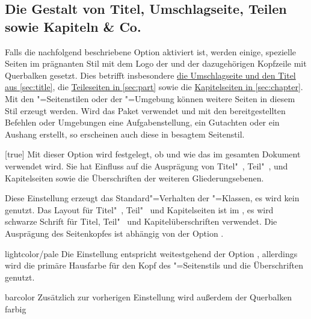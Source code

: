 \begin{Declaration*}{}
\begin{Declaration*}{}
\begin{Declaration*}{}
\subsection{Die Gestalt von Titel, Umschlagseite, Teilen sowie Kapiteln \& Co.}
%
%
%
%
Falls die nachfolgend beschriebene Option  aktiviert ist, 
werden einige, spezielle Seiten im prägnanten Stil mit dem Logo der \TnUD und 
der dazugehörigen Kopfzeile mit Querbalken gesetzt. Dies betrifft insbesondere 
\hyperref[sec:title]{die Umschlagseite und den Titel aus \autoref{sec:title}}, 
die \hyperref[sec:part]{Teileseiten in \autoref{sec:part}} sowie die
\hyperref[sec:chapter]{Kapitelseiten in \autoref{sec:chapter}}. Mit den 
"=Seitenstilen oder der "=Umgebung 
können weitere Seiten in diesem Stil erzeugt werden. Wird das Paket 
 verwendet und mit den bereitgestellten Befehlen oder 
Umgebungen eine Aufgabenstellung, ein Gutachten oder ein Aushang erstellt, so 
erscheinen auch diese in besagtem Seitenstil.
%
\begin{Declaration}[%
  v2.03!\Option{cd=bicolor}:%
    Farbeinsatz nur im Kopf mit farbig abgesetztem Querbalken;
  v2.03!\Option{cd=fullcolor}:%
    voller Farbeinsatz mit farbig abgesetztem Querbalken;%
  v2.04!\Option{cd=barcolor}:nur farbig abgesetzter Querbalken;%
]{}[true]
\printdeclarationlist%
%
Mit dieser Option wird festgelegt, ob und wie das \TUDCD im gesamten Dokument 
verwendet wird. Sie hat Einfluss auf die Ausprägung von Titel"~, Teil"~, und 
Kapitelseiten sowie die Überschriften der weiteren Gliederungsebenen.
%
\begin{values}{}
\itemfalse
  Diese Einstellung erzeugt das Standard"=Verhalten der \KOMAScript"=Klassen, 
  es wird kein \CD genutzt.
  Das Layout für Titel"~, Teil"~ und Kapitelseiten ist im \CD, es wird 
  schwarze Schrift für Titel, Teil"~ und Kapitelüberschriften verwendet. Die 
  Ausprägung des Seitenkopfes ist abhängig von der Option .
\item[lightcolor/pale]
  Die Einstellung entspricht weitestgehend der Option , 
  allerdings wird die primäre Hausfarbe  für den Kopf des 
  "=Seitenstils und die Überschriften genutzt.
\item[barcolor]
  Zusätzlich zur vorherigen Einstellung wird außerdem der Querbalken farbig 

\end{values}
\end{Declaration}
\end{Declaration*}
\end{Declaration*}
\end{Declaration*}
